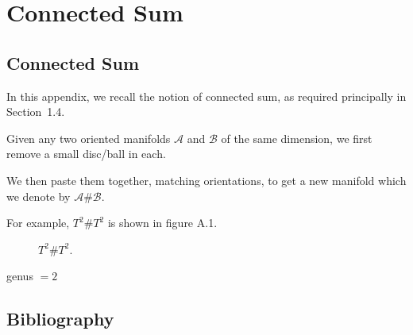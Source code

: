 \chapter{Connected Sum}

\section{Connected Sum}

In this appendix, we recall the notion of connected sum, as required
principally in Section~1.4.

Given any two oriented manifolds \(\mathcal{A}\) and \(\mathcal{B}\) of the
same dimension, we first remove a small disc/ball in each.

We then paste them together, matching orientations, to get a new manifold
which we denote by \(\mathcal{A}\#\mathcal{B}\).

\begin{figure}[p]
  \centering
\end{figure}

For example, \(T^2 \# T^2\) is shown in figure A.1.

\begin{figure}[p]
  \centering
  \caption{\(T^2 \# T^2\).}
\end{figure}

genus \(= 2\)

\section*{Bibliography}

